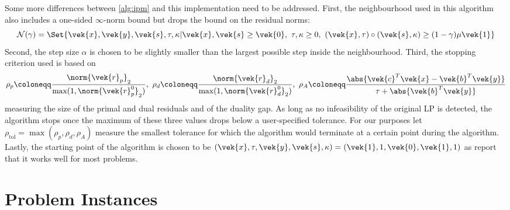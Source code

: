 Some more differences between \cref{alg:ipm} and this implementation need to be addressed.
First, the neighbourhood used in this algorithm also includes a one-sided \(\infty\)-norm bound but drops the bound on the residual norms:
\begin{equation}
  \mathcal{N}(\gamma) = \Set{ \vek{x}, \vek{y}, \vek{s}, \tau, \kappa | \vek{x}, \vek{s} \geq \vek{0}, \ \tau, \kappa \geq 0, \ (\vek{x}, \tau) \circ (\vek{s}, \kappa) \geq (1-\gamma) \mu \vek{1} }
\end{equation}
Second, the step size \(\alpha\) is chosen to be slightly smaller than the largest possible step inside the neighbourhood.
Third, the stopping criterion used is based on 
\begin{equation}
  \rho_p \coloneqq \frac{\norm{\vek{r}_p}_2}{\max(1, \norm{\vek{r}^0_p}_2)}, \ 
  \rho_d \coloneqq \frac{\norm{\vek{r}_d}_2}{\max(1, \norm{\vek{r}^0_d}_2)}, \ 
  \rho_A \coloneqq \frac{\abs{\vek{c}^T\vek{x} - \vek{b}^T \vek{y}}}{\tau + \abs{\vek{b}^T\vek{y}}}
\end{equation}
measuring the size of the primal and dual residuals and of the duality gap.
As long as no infeasibility of the original LP is detected, the algorithm stops once the maximum of these three values drops below a user-specified tolerance.
For our purposes let \(\rho_{\mathrm{tol}} = \max(\rho_p, \rho_d, \rho_A)\) measure the smallest tolerance for which the algorithm would terminate at a certain point during the algorithm.
Lastly, the starting point of the algorithm is chosen to be \((\vek{x}, \tau, \vek{y}, \vek{s}, \kappa) = (\vek{1}, 1, \vek{0}, \vek{1}, 1)\) as \textcite{AndersenAndersen-MosekInteriorPointMethod} report that it works well for most problems.

\section{Problem Instances}

